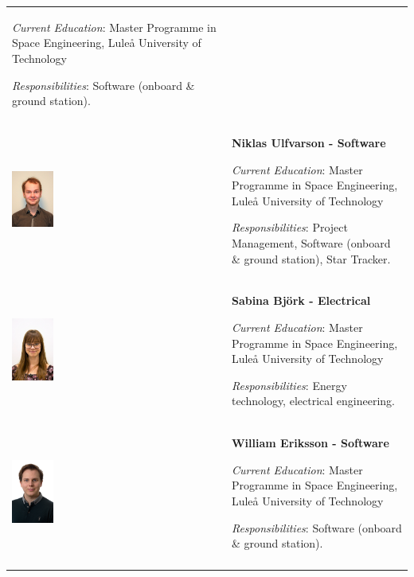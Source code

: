 \begin{longtable}[]{m{} m{}}
\smallskip
\textit{Current Education}: Master Programme in Space Engineering, Luleå University of Technology

\smallskip
\textit{Responsibilities}: Software (onboard \& ground station).
\bigskip
\\

\includegraphics[width=0.2\textwidth]{0-cover/img/TEAMPICS/Niklas_final.jpg}  & \textbf{Niklas Ulfvarson - Software}

\smallskip
\textit{Current Education}: Master Programme in Space Engineering, Luleå University of Technology

\smallskip
\textit{Responsibilities}: Project Management, Software (onboard \& ground station), Star Tracker.
\bigskip
\\

\includegraphics[width=0.2\textwidth]{0-cover/img/TEAMPICS/Sabina_final.jpg}  & \textbf{Sabina Bj\"ork - Electrical}

\smallskip
\textit{Current Education}: Master Programme in Space Engineering, Luleå University of Technology

\smallskip
\textit{Responsibilities}: Energy technology, electrical engineering.
\bigskip
\\

\includegraphics[width=0.2\textwidth]{0-cover/img/TEAMPICS/William_final.jpg}  & \textbf{William Eriksson - Software}

\smallskip
\textit{Current Education}: Master Programme in Space Engineering, Luleå University of Technology

\smallskip
\textit{Responsibilities}: Software (onboard \& ground station).
\bigskip
\\

\label{tab:people}
\end{longtable}
\raggedbottom
